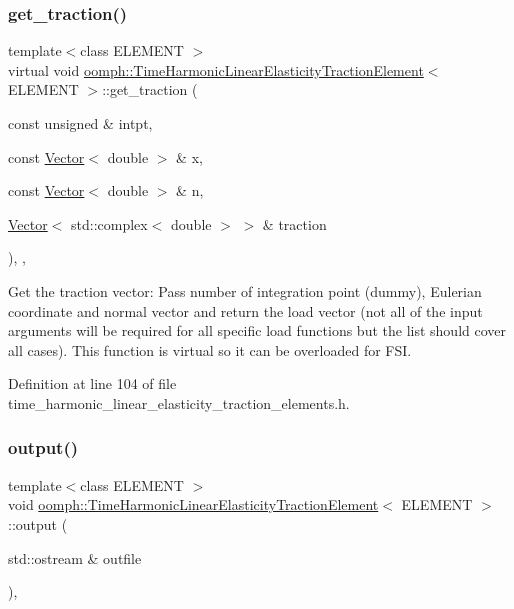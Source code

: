 \subsubsection{\texorpdfstring{get\+\_\+traction()}{get\_traction()}}
{\footnotesize\ttfamily template$<$class E\+L\+E\+M\+E\+NT $>$ \\
virtual void \hyperlink{classoomph_1_1TimeHarmonicLinearElasticityTractionElement}{oomph\+::\+Time\+Harmonic\+Linear\+Elasticity\+Traction\+Element}$<$ E\+L\+E\+M\+E\+NT $>$\+::get\+\_\+traction (\begin{DoxyParamCaption}\item[{const unsigned \&}]{intpt,  }\item[{const \hyperlink{classoomph_1_1Vector}{Vector}$<$ double $>$ \&}]{x,  }\item[{const \hyperlink{classoomph_1_1Vector}{Vector}$<$ double $>$ \&}]{n,  }\item[{\hyperlink{classoomph_1_1Vector}{Vector}$<$ std\+::complex$<$ double $>$ $>$ \&}]{traction }\end{DoxyParamCaption})\hspace{0.3cm}{\ttfamily [inline]}, {\ttfamily [protected]}, {\ttfamily [virtual]}}



Get the traction vector\+: Pass number of integration point (dummy), Eulerian coordinate and normal vector and return the load vector (not all of the input arguments will be required for all specific load functions but the list should cover all cases). This function is virtual so it can be overloaded for F\+SI. 



Definition at line 104 of file time\+\_\+harmonic\+\_\+linear\+\_\+elasticity\+\_\+traction\+\_\+elements.\+h.

\mbox{\label{classoomph_1_1TimeHarmonicLinearElasticityTractionElement_a52aee2a2a24e6bc7c33c67900eb520bf}} 
\subsubsection{\texorpdfstring{output()}{output()}\hspace{0.1cm}{\footnotesize\ttfamily [1/4]}}
{\footnotesize\ttfamily template$<$class E\+L\+E\+M\+E\+NT $>$ \\
void \hyperlink{classoomph_1_1TimeHarmonicLinearElasticityTractionElement}{oomph\+::\+Time\+Harmonic\+Linear\+Elasticity\+Traction\+Element}$<$ E\+L\+E\+M\+E\+NT $>$\+::output (\begin{DoxyParamCaption}\item[{std\+::ostream \&}]{outfile }\end{DoxyParamCaption})\hspace{0.3cm}{\ttfamily [inline]}, {\ttfamily [virtual]}}



